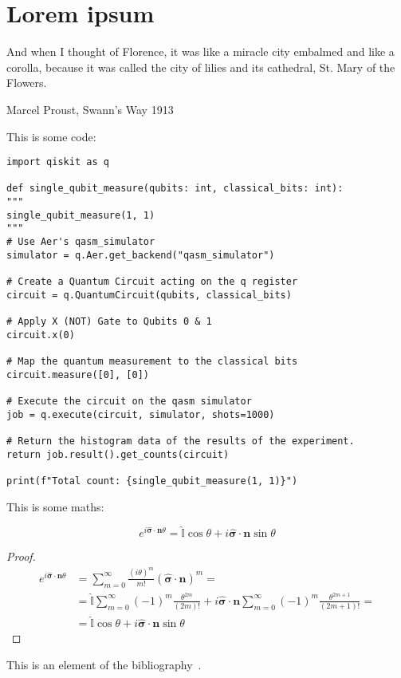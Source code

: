 \section{Lorem ipsum}
\epigraph{And when I thought of Florence, it was like a miracle city embalmed and like a corolla, because it was called the city of lilies and its cathedral, St. Mary of the Flowers.}{Marcel Proust, Swann's Way 1913}



This is some code:
\begin{verbatim}
import qiskit as q

def single_qubit_measure(qubits: int, classical_bits: int):
"""
single_qubit_measure(1, 1)
"""
# Use Aer's qasm_simulator
simulator = q.Aer.get_backend("qasm_simulator")

# Create a Quantum Circuit acting on the q register
circuit = q.QuantumCircuit(qubits, classical_bits)

# Apply X (NOT) Gate to Qubits 0 & 1
circuit.x(0)

# Map the quantum measurement to the classical bits
circuit.measure([0], [0])

# Execute the circuit on the qasm simulator
job = q.execute(circuit, simulator, shots=1000)

# Return the histogram data of the results of the experiment.
return job.result().get_counts(circuit)

print(f"Total count: {single_qubit_measure(1, 1)}")
\end{verbatim}
This is some maths:


\begin{theorem}
\begin{equation*}
e^{i\hat{\boldsymbol{\sigma}} \cdot \mathbf{n}\theta} = \hat{\mathbb{I}}\cos\theta + i\hat{\boldsymbol{\sigma}} \cdot \mathbf{n} \sin\theta
\end{equation*}
\end{theorem}
\begin{proof}
\begin{equation*}
\begin{split}
    e^{i\hat{\boldsymbol{\sigma}} \cdot \mathbf{n}\theta} &=  \sum_{m=0}^\infty \frac{(i\theta)^m}{m!} (\hat{\boldsymbol{\sigma}} \cdot \mathbf{n} )^m = \\
    &= \hat{\mathbb{I}} \sum_{m=0}^\infty (-1)^m \frac{\theta^{2m}}{(2m)!}  + i\hat{\boldsymbol{\sigma}} \cdot \mathbf{n} \sum_{m=0}^\infty (-1)^m \frac{\theta^{2m+1}}{(2m+1)!} = \\
    &= \hat{\mathbb{I}}\cos\theta + i\hat{\boldsymbol{\sigma}} \cdot \mathbf{n} \sin\theta
\end{split}
\end{equation*}
\end{proof}

This is an element of the bibliography~\cite{2022}.
